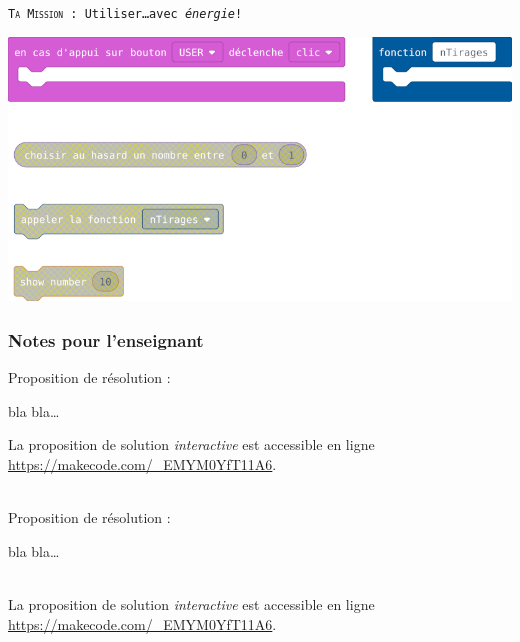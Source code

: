 \begin{eleve}    
    \texttt{\textsc{Ta Mission} : Utiliser\ldots avec \emph{énergie}!}
    
    \includegraphics[width=0.5\linewidth]{res/st-pf-00-eleve.png}
\end{eleve}



\subsubsection{Notes pour l'enseignant}

%
%
\begin{methode}
Proposition de résolution :

bla bla\ldots
\end{methode}


\begin{remarque}
    La proposition de solution \emph{interactive} est accessible en ligne \url{https://makecode.com/_EMYM0YfT11A6}.
\end{remarque}


%

\begin{minipage}[t]{0.7\linewidth}
    \begin{methode}~\\
    Proposition de résolution :
    
    bla bla\ldots
    \end{methode}
\end{minipage}
\hfill
\begin{minipage}[t]{0.3\linewidth}
    \begin{remarque}~\\
        La proposition de solution \emph{interactive} est accessible en ligne \url{https://makecode.com/_EMYM0YfT11A6}.
    \end{remarque}
\end{minipage}